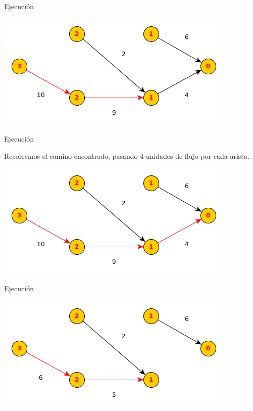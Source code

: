 \documentclass{beamer}
\begin{document}
\begin{frame}{Ejecución}

    
    \includegraphics[scale=0.6]{dinitz/dinitz12.png}
    
\end{frame}

\begin{frame}{Ejecución}

    Recorremos el camino encontrado, pasando 4 unidades de flujo por cada arista.
    
    \includegraphics[scale=0.6]{dinitz/dinitz13.png}
    
\end{frame}

\begin{frame}{Ejecución}

    
    \includegraphics[scale=0.6]{dinitz/dinitz14.png}
    
\end{frame}
\end{document}
